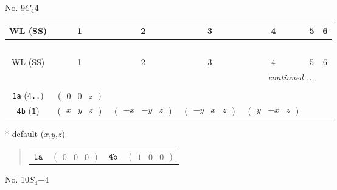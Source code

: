 \documentclass[fleqn,9pt,landscape]{jsarticle}
\begin{document}
\newpage
No. 9\quad$C_{4}$\quad$4$\quad[ tetragonal ]
\begin{center}
\renewcommand{\arraystretch}{1.2}
\begin{longtable}{ccccccc}
 \hline \hline
WL (SS) & 1 & 2 & 3 & 4 & 5 & 6 \\ \hline \endfirsthead

\multicolumn{6}{l}{\tablename\ \thetable{}} \\
 \hline \hline
WL (SS) & 1 & 2 & 3 & 4 & 5 & 6 \\ \hline \endhead

 \hline \hline
\multicolumn{6}{r}{\footnotesize\it continued ...} \\ \endfoot

 \hline \hline
\multicolumn{6}{r}{} \\ \endlastfoot

{\tt 1a} ({\tt 4..}) & $ \begin{pmatrix} 0 & 0 & z \end{pmatrix} $ & $  $ & $  $ & $  $ \\ \hline
{\tt 4b} ({\tt 1}) & $ \begin{pmatrix} x & y & z \end{pmatrix} $ & $ \begin{pmatrix} - x & - y & z \end{pmatrix} $ & $ \begin{pmatrix} - y & x & z \end{pmatrix} $ & $ \begin{pmatrix} y & - x & z \end{pmatrix} $ \\
\end{longtable}
\end{center}
* default ($x$,$y$,$z$)
\begin{quote}
\begin{tabular}{cccc}
$ {\tt 1a} $ & $ \begin{pmatrix} 0 & 0 & 0 \end{pmatrix} $ & $ {\tt 4b} $ & $ \begin{pmatrix} 1 & 0 & 0 \end{pmatrix} $
\end{tabular}
\end{quote}
\newpage
No. 10\quad$S_{4}$\quad$-4$\quad[ tetragonal ]
\end{document}
